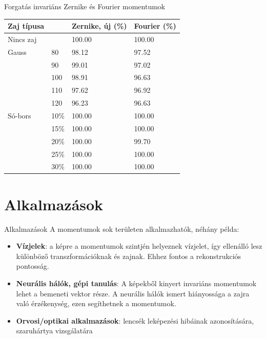 \documentclass{beamer}
\begin{document}
\begin{frame}{Forgatás invariáns Zernike és Fourier momentumok}
    \vskip 1cm
    \begin{table}[tbp]
        \centering
        \begin{tabular}{|p{2cm}|p{1.5cm}|p{2.8cm}<{\raggedright}|p{2cm}|} \hline
            \textbf{Zaj típusa} & & \textbf{Zernike, új} (\%) & \textbf{Fourier} (\%) \\ \hline\hline
            Nincs zaj & & 100.00 & 100.00 \\ \hline\hline
            Gauss & 80 & 98.12 & 97.52 \\ \cline{2-4}
            & 90 & 99.01 & 97.02 \\ \cline{2-4}
            & 100 & 98.91 & 96.63 \\ \cline{2-4}
            & 110 & 97.62 & 96.92 \\ \cline{2-4}
            & 120 & 96.23 & 96.63 \\ \hline\hline
            Só-bors & 10\% & 100.00 & 100.00 \\ \cline{2-4}
            & 15\% & 100.00 & 100.00 \\ \cline{2-4}
            & 20\% & 100.00 & 99.70 \\ \cline{2-4}
            & 25\% & 100.00 & 100.00 \\ \cline{2-4}
            & 30\% & 100.00 & 100.00 \\ \cline{1-4}
        \end{tabular}
    \end{table}
\end{frame}

\section{Alkalmazások}
\begin{frame}{Alkalmazások}
    \vskip 5mm
    A momentumok sok területen alkalmazhatók, néhány példa:
    \begin{itemize}
    \item \textbf{Vízjelek}: a képre a momentumok szintjén helyeznek vízjelet, így ellenálló lesz különböző transzformációknak és zajnak. Ehhez fontos a rekonstrukciós pontosság.~\cite{watermarking_auth}
    \item \textbf{Neurális hálók, gépi tanulás}: A képekből kinyert invariáns momentumok lehet a bemeneti vektor része. A neurális hálók ismert hiányossága a zajra való érzékenység, ezen segíthetnek a momentumok.~\cite{nn_noise_robust}
    \item \textbf{Orvosi/optikai alkalmazások}: lencsék leképezési hibáinak azonosítására, szaruhártya vizsgálatára~\cite{wavefront}
    \end{itemize}
\end{frame}
\end{document}
